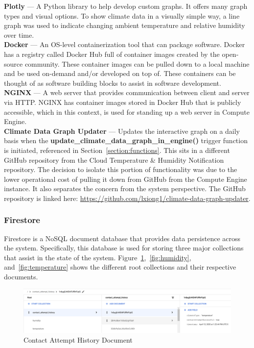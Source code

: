 \documentclass{article}
\begin{document}
\textbf{Plotly} — A Python library to help develop custom graphs. It offers many graph types and visual options. To show climate data in a visually simple way, a line graph was used to indicate changing ambient temperature and relative humidity over time.\\

\textbf{Docker} — An OS-level containerization tool that can package software. Docker has a registry called Docker Hub full of container images created by the open-source community. These container images can be pulled down to a local machine and be used on-demand and/or developed on top of. These containers can be thought of as software building blocks to assist in software development.\\

\textbf{NGINX} — A web server that provides communication between client and server via HTTP. NGINX has container images stored in Docker Hub that is publicly accessible, which in this context, is used for standing up a web server in Compute Engine.\\

\textbf{Climate Data Graph Updater} — Updates the interactive graph on a daily basis when the \textbf{update\_climate\_data\_graph\_in\_engine()} trigger function is initiated, referenced in Section~\ref{section:functions}. This sits in a different GitHub repository from the Cloud Temperature \& Humidity Notification repository. The decision to isolate this portion of functionality was due to the lower operational cost of pulling it down from GitHub from the Compute Engine instance. It also separates the concern from the system perspective. The GitHub repository is linked here: \url{https://github.com/lxiong1/climate-data-graph-updater}.

\subsubsection{Firestore}
Firestore is a NoSQL document database that provides data persistence across the system. Specifically, this database is used for storing three major collections that assist in the state of the system. Figure~\ref{fig:contact-attempt-history},~\ref{fig:humidity}, and~\ref{fig:temperature} shows the different root collections and their respective documents.

\begin{figure}[H]
    \center
    \includegraphics[width=\textwidth]{images/database-contact-attempt-history.png}
    \caption{Contact Attempt History Document}
    \label{fig:contact-attempt-history}
\end{figure}
\end{document}

